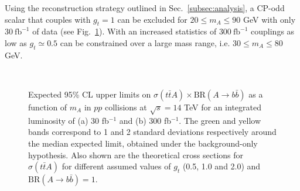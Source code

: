 \documentclass[preprintnumbers,superscriptaddress,nofootinbib,aps,prd,floatfix]{revtex4}
\newcommand{\ttbar}{\ensuremath{t\bar{t}}}
\newcommand{\BR} {\ensuremath{\mathrm{BR}}}
\begin{document}
Using the reconstruction strategy outlined in Sec.~\ref{subsec:analysis}, a CP-odd scalar that couples with $g_t=1$ can be excluded for $20 \leq m_A \leq 90$ GeV with only $30~\mathrm{fb}^{-1}$ of data (see Fig.~\ref{fig:limit_plots}). With an increased statistics of $300~\mathrm{fb}^{-1}$ couplings as low as $g_t \simeq 0.5$ can be constrained over a large mass range, i.e. $30 \leq m_A \leq 80$ GeV.

\begin{figure}[htbp]
\begin{center}
 \\
\caption{\small {Expected 95\% CL upper limits on $\sigma(\ttbar A) \times \BR(A\to b\bar{b})$ as a function of $m_A$ 
in $pp$ collisions at $\sqrt{s}=14$ TeV for an integrated luminosity of (a) 30 fb$^{-1}$ and (b) 300 fb$^{-1}$. 
The green and yellow bands correspond to 1 and 2 standard deviations respectively around the median expected limit, 
obtained under the background-only hypothesis. Also shown are the theoretical cross sections for $\sigma(\ttbar A)$ for different  
assumed values of $g_t$ (0.5, 1.0 and 2.0) and $\BR(A\to b\bar{b})=1$.}}
\label{fig:limit_plots}
\end{center}
\end{figure}
\end{document}
